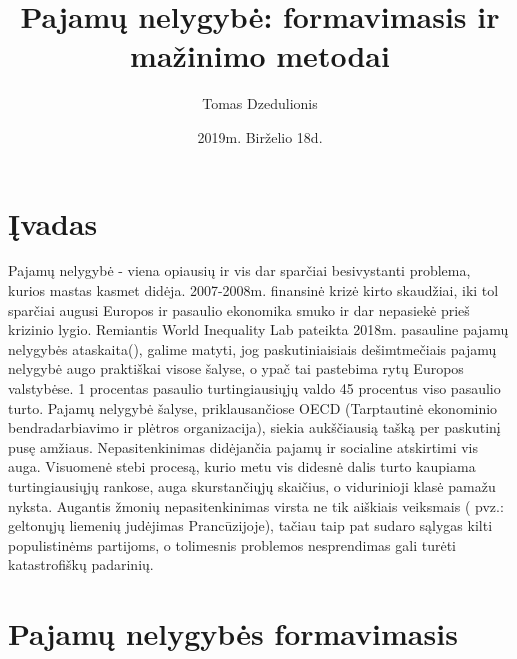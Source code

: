 \documentclass[12pt,a4paper,titlepage]{article}
\title{Pajamų nelygybė: formavimasis ir mažinimo metodai}
\author{Tomas Dzedulionis}
\date{2019m. Birželio 18d.}
\begin{document}
\maketitle
\newpage
\setcounter{tocdepth}{3}
\setcounter{secnumdepth}{3}
\tableofcontents
\newpage
\section{Įvadas}
Pajamų nelygybė - viena opiausių ir vis dar sparčiai besivystanti problema, kurios mastas kasmet didėja. 2007-2008m. finansinė krizė kirto skaudžiai, iki tol sparčiai augusi Europos ir pasaulio ekonomika smuko ir dar nepasiekė prieš krizinio lygio. Remiantis World Inequality Lab pateikta 2018m. pasauline pajamų nelygybės ataskaita(\cite{alvaredo2018world}), galime matyti, jog paskutiniaisiais dešimtmečiais pajamų nelygybė augo praktiškai visose šalyse, o ypač tai pastebima rytų Europos valstybėse. 1 procentas pasaulio turtingiausiųjų valdo 45 procentus viso pasaulio turto. Pajamų nelygybė šalyse, priklausančiose OECD (Tarptautinė ekonominio bendradarbiavimo ir plėtros organizacija), siekia aukščiausią tašką per paskutinį pusę amžiaus. Nepasitenkinimas didėjančia pajamų ir socialine atskirtimi vis auga. Visuomenė stebi procesą, kurio metu vis didesnė dalis turto kaupiama turtingiausiųjų rankose, auga skurstančiųjų skaičius, o vidurinioji klasė pamažu nyksta. Augantis žmonių nepasitenkinimas virsta ne tik aiškiais veiksmais ( pvz.: geltonųjų liemenių judėjimas Prancūzijoje), tačiau taip pat sudaro sąlygas kilti populistinėms partijoms, o tolimesnis problemos nesprendimas gali turėti katastrofiškų padarinių. 

\section{Pajamų nelygybės formavimasis}
\end{document}
